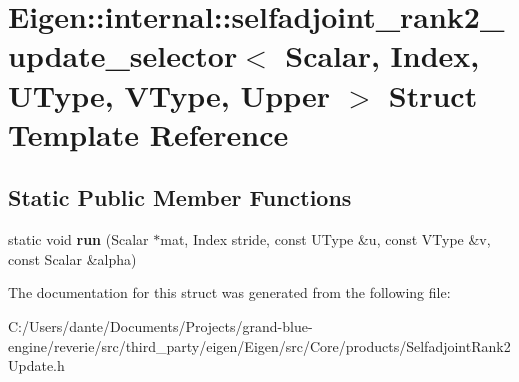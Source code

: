 \hypertarget{struct_eigen_1_1internal_1_1selfadjoint__rank2__update__selector_3_01_scalar_00_01_index_00_01_uf7a068ce7ab78b9bb81bd0ca858e99d2}{}\section{Eigen\+::internal\+::selfadjoint\+\_\+rank2\+\_\+update\+\_\+selector$<$ Scalar, Index, U\+Type, V\+Type, Upper $>$ Struct Template Reference}
\label{struct_eigen_1_1internal_1_1selfadjoint__rank2__update__selector_3_01_scalar_00_01_index_00_01_uf7a068ce7ab78b9bb81bd0ca858e99d2}
\subsection*{Static Public Member Functions}
\begin{DoxyCompactItemize}
\item 
\mbox{\label{struct_eigen_1_1internal_1_1selfadjoint__rank2__update__selector_3_01_scalar_00_01_index_00_01_uf7a068ce7ab78b9bb81bd0ca858e99d2_a3e300809989bb33416ab62cd52795709}} 
static void {\bfseries run} (Scalar $\ast$mat, Index stride, const U\+Type \&u, const V\+Type \&v, const Scalar \&alpha)
\end{DoxyCompactItemize}


The documentation for this struct was generated from the following file\+:\begin{DoxyCompactItemize}
\item 
C\+:/\+Users/dante/\+Documents/\+Projects/grand-\/blue-\/engine/reverie/src/third\+\_\+party/eigen/\+Eigen/src/\+Core/products/Selfadjoint\+Rank2\+Update.\+h\end{DoxyCompactItemize}
